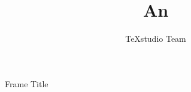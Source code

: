 \documentclass{beamer}
\title{An}
\author{TeXstudio Team}
\begin{document}
\begin{frame}[plain]
    \maketitle
\end{frame}
\begin{frame}{Frame Title}
\end{frame}
\end{document}
